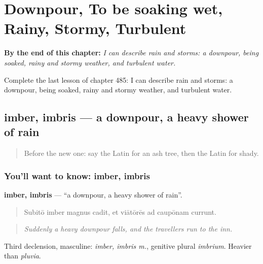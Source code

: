 
\chapter{Downpour, To be soaking wet, Rainy, Stormy, Turbulent}
\label{ch:la-downpour-to-be-soaking-wet-rainy-stormy-turbulent}

\begin{chapteropening}
\textbf{By the end of this chapter:} \emph{I can describe rain and storms: a downpour, being soaked, rainy and stormy weather, and turbulent water.}

Complete the last lesson of chapter 485: I can describe rain and storms: a downpour, being soaked, rainy and stormy weather, and turbulent water.
\end{chapteropening}

\section[imber, imbris]{imber, imbris — a downpour, a heavy shower of rain}

\label{lesson:LA-C485-imber}



\begin{quote}
Before the new one: say the Latin for an ash tree, then the Latin for shady.
\end{quote}

\subsection*{You'll want to know: imber, imbris}
\textbf{imber, imbris} — \textquotedblleft{}a downpour, a heavy shower of rain\textquotedblright{}.

\begin{quote}
Subitō imber magnus cadit, et viātōrēs ad caupōnam currunt.
\end{quote}

\begin{quote}
\emph{Suddenly a heavy downpour falls, and the travellers run to the inn.}
\end{quote}

Third declension, masculine: \emph{imber, imbris m.}, genitive plural \emph{imbrium}. Heavier than \emph{pluvia}.

